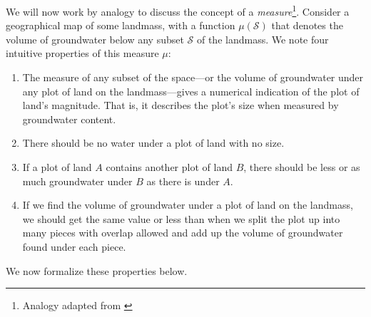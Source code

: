 We will now work by analogy to discuss the concept of a \textit{measure}\footnote{Analogy adapted from \citep{mandelbrotmultifractal}}. Consider a geographical map of some landmass, with a function $ \mu(\mathcal{S}) $ that denotes the volume of groundwater below any subset $ \mathcal{S} $ of the landmass. We note four intuitive properties of this measure $ \mu $:\begin{enumerate}
\item The measure of any subset of the space---or the volume of groundwater under any plot of land on the landmass---gives a numerical indication of the plot of land's magnitude. That is, it describes the plot's size when measured by groundwater content.
\item\label{measureofanullset} There should be no water under a plot of land with no size. 
\item\label{measureofsubsets} If a plot of land $ A $ contains another plot of land $ B $, there should be less or as much groundwater under $B$ as there is under $A$. 
\item\label{measureaddition} If we find the volume of groundwater under a plot of land on the landmass, we should get the same value or less than when we split the plot up into many pieces with overlap allowed and add up the volume of groundwater found under each piece. 
\end{enumerate}
We now formalize these properties below.

